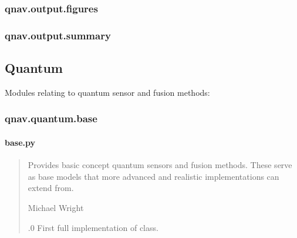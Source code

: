 \documentclass[letterpaper,10pt,english]{sphinxmanual}
\begin{document}
\sphinxstepscope


\subsubsection{qnav.output.figures}
\label{\detokenize{modules/output/figures:module-qnav.output.figures}}\label{\detokenize{modules/output/figures:qnav-output-figures}}\label{\detokenize{modules/output/figures::doc}}
\sphinxstepscope


\subsubsection{qnav.output.summary}
\label{\detokenize{modules/output/summary:module-qnav.output.summary}}\label{\detokenize{modules/output/summary:qnav-output-summary}}\label{\detokenize{modules/output/summary::doc}}

\subsection{Quantum}
\label{\detokenize{usage/packages:quantum}}
\sphinxAtStartPar
Modules relating to quantum sensor and fusion methods:

\sphinxstepscope


\subsubsection{qnav.quantum.base}
\label{\detokenize{modules/quantum/base:module-qnav.quantum.base}}\label{\detokenize{modules/quantum/base:qnav-quantum-base}}\label{\detokenize{modules/quantum/base::doc}}

\paragraph{base.py}
\label{\detokenize{modules/quantum/base:base-py}}\begin{quote}\begin{description}
\sphinxAtStartPar
Provides basic concept quantum sensors and fusion methods.
These serve as base models that more advanced and realistic
implementations can extend from.

\sphinxAtStartPar
Michael Wright \sphinxhyphen{} 

.0 \sphinxhyphen{} First full implementation of class.

\end{description}\end{quote}
\end{document}
